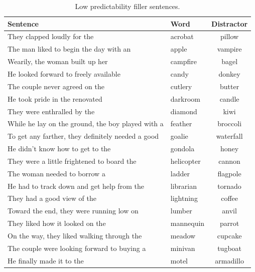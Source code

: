 \begin{table}[!h]
\caption{Low predictability filler sentences.}
\label{tbl:sentlowfiller}
\small
\centering
\begin{tabular}{llc}
\toprule
Sentence                                                                     & Word        & Distractor  \\
\midrule
They clapped loudly for the                       & acrobat    & pillow      \\
The man liked to begin the day with an            & apple      & vampire     \\
Wearily, the woman built up her                   & campfire   & bagel       \\
He looked forward to freely available             & candy      & donkey      \\
The couple never agreed on the                    & cutlery    & butter      \\
He took pride in the renovated                    & darkroom   & candle      \\
They were enthralled by the                       & diamond    & kiwi        \\
While he lay on the ground, the boy played with a & feather    & broccoli    \\
To get any farther, they definitely needed a good & goalie     & waterfall   \\
He didn't know how to get to the                  & gondola    & honey       \\
They were a little frightened to board the        & helicopter & cannon      \\
The woman needed to borrow a                      & ladder     & flagpole    \\
He had to track down and get help from the        & librarian  & tornado     \\
They had a good view of the                       & lightning  & coffee      \\
Toward the end, they were running low on          & lumber     & anvil       \\
They liked how it looked on the                   & mannequin  & parrot      \\
On the way, they liked walking through the        & meadow     & cupcake     \\
The couple were looking forward to buying a       & minivan    & tugboat     \\
He finally made it to the                         & motel      & armadillo   \\

\end{tabular}
\end{table}
